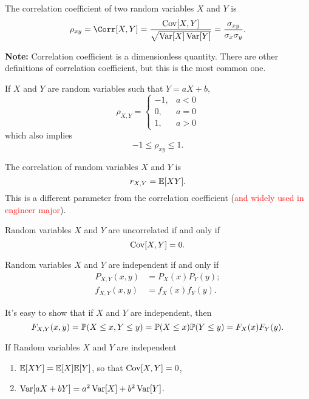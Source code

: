 \begin{definition}
    The correlation coefficient of two random variables $X$ and $Y$ is
    \[\rho_{xy}=\Corr[X,Y]=\frac{\Cov[X,Y]}{\sqrt{\Var[X]\Var[Y]}}=\frac{\sigma_{xy}}{\sigma_x\sigma_y}.\]
\end{definition}
\textbf{Note:} Correlation coefficient is a dimensionless quantity. There are other definitions of correlation coefficient, but this is the most common one.

\begin{theorem}
    If $X$ and $Y$ are random variables such that $Y=aX+b$,
    \[\rho_{X,Y}={
        \begin{cases}
            -1, & a<0\\
            0, & a=0\\
            1, & a>0
        \end{cases}
    }\]
    which also implies
    \[-1\leq \rho_{xy}\leq 1.\]
\end{theorem}

\begin{definition}
    [Correlation]
    The correlation of random variables $X$ and $Y$ is
    \[r_{X,Y} = \E{XY}.\]
    This is a different parameter from the correlation coefficient (\textcolor{red}{and widely used in engineer major}).
\end{definition}

\begin{definition}
    [Uncorrelatedness]
    Random variables $X$ and $Y$ are uncorrelated if and only if
    \[\mathop{\mathrm{Cov}}\nolimits[X,Y]=0.\]
\end{definition}

\begin{definition}[Independence]
    Random variables $X$ and $Y$ are independent if and only if
    \begin{align}
        P_{X,Y}(x,y) &=P_X(x)P_Y(y); \tag{Discrete}\\
        f_{X,Y}(x,y) &=f_X(x)f_Y(y). \tag{Continuous}
    \end{align}
\end{definition}
It's easy to show that if $X$ and $Y$ are independent, then
\[F_{X,Y}(x,y)=\P{X\leq x, Y\leq y}=\P{X\leq x}\P{Y\leq y}=F_X(x)F_Y(y).\]

\begin{theorem}
    If Random variables $X$ and $Y$ are independent
    \begin{enumerate}
        \item $\E{XY}=\E{X}\E{Y}$, so that $\mathop{\mathrm{Cov}}\nolimits[X, Y]=0$,
        \item $\mathop{\mathrm{Var}}\nolimits[aX+bY]=a^2\mathop{\mathrm{Var}}\nolimits[X]+b^2\mathop{\mathrm{Var}}\nolimits[Y]$.
    \end{enumerate}
\end{theorem}

